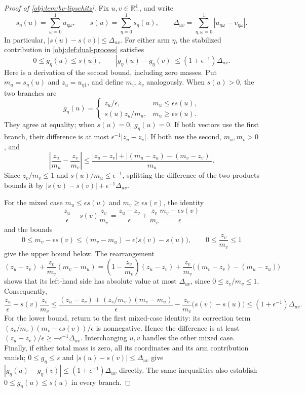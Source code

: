 \documentclass[11pt]{article}
\begin{document}
\begin{proof}[Proof of \cref{obj:lem:bv-lipschitz}]
Fix \(u,v\in\mathbb R_+^4\), and write
\[
s_\eta(u)=\sum_{\omega=0}^1u_{\eta\omega},\qquad
s(u)=\sum_{\eta=0}^1s_\eta(u),\qquad
\Delta_{uv}=\sum_{\eta,\omega=0}^1|u_{\eta\omega}-v_{\eta\omega}|.
\]
In particular, \(|s(u)-s(v)|\leq\Delta_{uv}\). For either arm \(\eta\), the stabilized contribution in \cref{obj:def:dual-process} satisfies
\[
0\leq g_\eta(u)\leq s(u),\qquad
|g_\eta(u)-g_\eta(v)|
 \leq(1+\epsilon^{-1})\Delta_{uv}.
\]
Here is a derivation of the second bound, including zero masses. Put
\(m_u=s_\eta(u)\) and \(z_u=u_{\eta1}\), and define \(m_v,z_v\) analogously.
When \(s(u)>0\), the two branches are
\[
g_\eta(u)=
\begin{cases}
z_u/\epsilon,&m_u\leq\epsilon s(u),\\
s(u)z_u/m_u,&m_u\geq\epsilon s(u).
\end{cases}
\]
They agree at equality; when \(s(u)=0\), \(g_\eta(u)=0\). If both vectors use the first branch, their difference is at most
\(\epsilon^{-1}|z_u-z_v|\). If both use the second, \(m_u,m_v>0\), and
\[
\left|\frac{z_u}{m_u}-\frac{z_v}{m_v}\right|
\leq
\frac{|z_u-z_v|+
 |(m_u-z_u)-(m_v-z_v)|}{m_u}.
\]
Since \(z_v/m_v\leq1\) and \(s(u)/m_u\leq\epsilon^{-1}\), splitting the difference of the two products bounds it by
\(|s(u)-s(v)|+\epsilon^{-1}\Delta_{uv}\).

For the mixed case \(m_u\leq\epsilon s(u)\) and
\(m_v\geq\epsilon s(v)\), the identity
\[
\frac{z_u}{\epsilon}-s(v)\frac{z_v}{m_v}
=
\frac{z_u-z_v}{\epsilon}
+\frac{z_v}{m_v}\frac{m_v-\epsilon s(v)}{\epsilon}
\]
and the bounds
\[
0\leq m_v-\epsilon s(v)
\leq(m_v-m_u)-\epsilon\bigl(s(v)-s(u)\bigr),
\qquad 0\leq\frac{z_v}{m_v}\leq1
\]
give the upper bound below. The rearrangement
\[
(z_u-z_v)+\frac{z_v}{m_v}(m_v-m_u)
=\left(1-\frac{z_v}{m_v}\right)(z_u-z_v)
 +\frac{z_v}{m_v}\bigl((m_v-z_v)-(m_u-z_u)\bigr)
\]
shows that its left-hand side has absolute value at most \(\Delta_{uv}\), since \(0\leq z_v/m_v\leq1\). Consequently,
\[
\frac{z_u}{\epsilon}-s(v)\frac{z_v}{m_v}
\leq \frac{(z_u-z_v)+(z_v/m_v)(m_v-m_u)}{\epsilon}
 -\frac{z_v}{m_v}\bigl(s(v)-s(u)\bigr)
\leq(1+\epsilon^{-1})\Delta_{uv}.
\]
For the lower bound, return to the first mixed-case identity: its correction term \((z_v/m_v)(m_v-\epsilon s(v))/\epsilon\) is nonnegative. Hence the difference is at least \((z_u-z_v)/\epsilon\geq-\epsilon^{-1}\Delta_{uv}\). Interchanging \(u,v\) handles the other mixed case. Finally, if either total mass is zero, all its coordinates and its arm contribution vanish; \(0\leq g_\eta\leq s\) and \(|s(u)-s(v)|\leq\Delta_{uv}\) give \(|g_\eta(u)-g_\eta(v)|\leq(1+\epsilon^{-1})\Delta_{uv}\) directly. The same inequalities also establish \(0\leq g_\eta(u)\leq s(u)\) in every branch. %


\end{proof}
\end{document}
